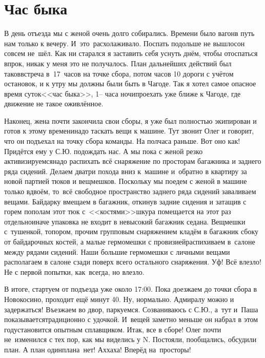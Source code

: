 \chapter{Час быка} 
\vepsianrose

В день отъезда мы с женой очень долго собирались. Времени было вагон\mdash в путь нам только к вечеру. И~это~расхолаживало. Поспать подольше не вышло\mdash сон совсем не~шёл. Как ни старался я заставить себя уснуть днём, чтобы отоспаться впрок, никак у меня это не получалось. План дальнейших действий был таков\mdash встреча в~17~часов на точке сбора, потом часов 10 дороги с учётом остановок, и к утру мы должны были быть в Чагоде. Так я хотел самое опасное время суток\mdash <<час быка>>, 1\thinspace\nobreakdash-- часа ночи\mdash проехать уже ближе к Чагоде, где движение не такое оживлённое. 

Наконец, жена почти закончила свои сборы, я уже был полностью экипирован и готов к этому времени\mdash надо таскать вещи к машине. Тут звонит Олег и говорит, что он подъехал на точку сбора команды. На полчаса раньше. Вот оно как! Придётся ему у С.Ю. подождать нас. А мы пока с женой резко активизируемся\mdash надо распихать всё снаряжение по просторам багажника и заднего ряда сидений. Делаем два\sdash три похода вниз к~машине и~обратно в квартиру за новой партией тюков и вещмешков. Поскольку мы поедем с женой в машине только вдвоём, то~всё свободное пространство заднего ряда сидений заваливаем вещами. Байдарку вмещаем в багажник, откинув задние сидения и затащив с горем пополам этот тюк с~<<костями>>\mdash шкура помещается на этот раз отдельно\mdash иначе упаковка не входит в невысокий багажник седана. Вещмешки с~тушенкой, топором, прочим групповым снаряжением кладём в багажник сбоку от байдарочных костей, а малые гермомешки с провизией\mdash распихиваем в~салоне между рядами сидений. Наши большие гермомешки с личными вещами располагаем в салоне сзади поверх всего остального снаряжения. Уф! Всё влезло! Не с первой попытки, как~всегда, но влезло. 

В итоге, стартуем от подъезда уже около 17:00. Пока доезжаем до точки сбора в Новокосино, проходит ещё минут 40. Ну, нормально. Адмиралу можно и задержаться! Въезжаем во двор, паркуемся. Созваниваюсь с С.Ю., а~тут и~Паша показывается\mdash традиционно с удочкой. И~вещей заметно меньше он набрал в этом году\mdash становится опытным сплавщиком. Итак, все в сборе! Олег почти не~изменился с тех пор, как мы виделись у N. Постояли, пообщались, обсудили план. А план один\mdash плана~нет! Ах\sdash ха\sdash ха! Вперёд на~просторы! 

